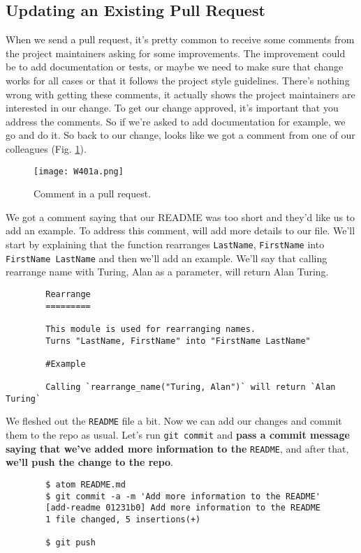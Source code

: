 	\subsection{Updating an Existing Pull Request}
	
	
	When we send a pull request, it's pretty common to receive some comments from the project maintainers asking for some improvements. The improvement could be to add documentation or tests, or maybe we need to make sure that change works for all cases or that it follows the project style guidelines. There's nothing wrong with getting these comments, it actually shows the project maintainers are interested in our change. To get our change approved, it's important that you address the comments. So if we're asked to add documentation for example, we go and do it. So back to our change, looks like we got a comment from one of our colleagues (Fig. \ref{W401a}).
	
	\begin{figure} 
		\caption{Comment in a pull request.}
		\centering
		\texttt{[image: W401a.png]}
		\label{W401a}
	\end{figure}
	
	
	We got a comment saying that our README was too short and they'd like us to add an example. To address this comment, will add more details to our file. We'll start by explaining that the function rearranges \texttt{LastName}, \texttt{FirstName} into \texttt{FirstName LastName} and then we'll add an example. We'll say that calling rearrange name with Turing, Alan as a parameter, will return Alan Turing.
	
	\begin{verbatim}
		Rearrange
		=========
		
		This module is used for rearranging names.
		Turns "LastName, FirstName" into "FirstName LastName"
		
		#Example
		
		Calling `rearrange_name("Turing, Alan")` will return `Alan Turing`	
	\end{verbatim}
	
	We fleshed out the \texttt{README} file a bit. Now we can add our changes and commit them to the repo as usual. Let's run \texttt{git commit} and \textbf{pass a commit message saying that we've added more information to the} \texttt{README}, and after that, \textbf{we'll push the change to the repo}.
	
	\begin{verbatim}
		$ atom README.md
		$ git commit -a -m 'Add more information to the README'
		[add-readme 01231b0] Add more information to the README
		1 file changed, 5 insertions(+)
		
		$ git push
	\end{verbatim}
	

